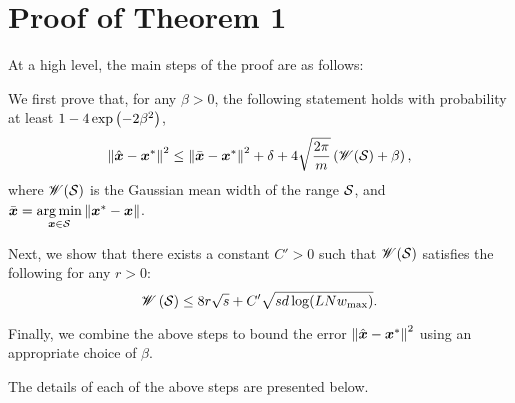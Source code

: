 \documentclass[journal]{IEEEtran}
\newcommand{\wid}{\mathscr{W}}
\begin{document}
\section{Proof of Theorem 1}\label{app:NN_error}
At a high level, the main steps of the proof are as follows: 
\begin{enumerate}[label={[\Alph*]},leftmargin=1cm]
\item We first prove that, for any $\beta>0$, the following statement holds with probability at least $1-4\exp\left(-2\beta^2\right)$,
\begin{equation}\label{eq:concentration}
\lV\hat{\vecx}-\vecx^*\rV^2\leq \lV\bar{\vecx}-\vecx^*\rV^2+\delta+4\sqrt{\frac{2\pi}{m}}\lb\wid(\calS)+\beta\rb,
\end{equation}
where $\wid(\calS)$ is the Gaussian mean width of the range $\mathcal{S}$, and $\bar{\boldsymbol{x}}=\underset{\boldsymbol{x}\in\mathcal{S}}{\arg\min}\left\Vert\boldsymbol{x}^*-\boldsymbol{x}\right\Vert$.
\item Next, we show that there exists a constant $C'>0$ such that $\wid(\calS)$ satisfies the following for any $r>0$:
\begin{equation}
\wid\lb \calS\rb\leq 8r\sqrt{s}+C'\sqrt{sd\log( LNw_{\max})}.
\end{equation}
\item Finally, we combine the above steps to bound the error $\left\Vert\hat{\boldsymbol{x}}-\boldsymbol{x}^*\right\Vert^2$ using an appropriate choice of $\beta$.
\end{enumerate} 
The details of each of the above steps are presented below.
\end{document}
